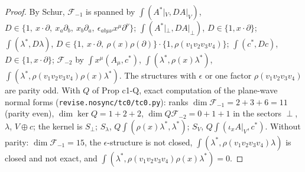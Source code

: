 \documentclass[11pt]{article}
\numberwithin{equation}{section}
\theoremstyle{plain}
\theoremstyle{definition}
\newcommand{\Ap}{A|_{\perp}}
\newcommand{\AV}{A|_V}
\begin{document}
\begin{proof}
By Schur, $\mathcal F_{-1}$ is spanned by $\int(A^*|_V,D\AV)$, $D\in\{1,\ x\cdot\partial,\ x_a\partial_b,\ x_b\partial_a,\ \epsilon_{ab\mu\nu}x^\mu\partial^\nu\}$; $\int(A^*|_\perp,D\Ap)$, $D\in\{1,x\cdot\partial\}$; $\int(\lambda^*,D\lambda)$, $D\in\{1,\ x\cdot\partial,\ \rho(x)\rho(\partial)\}\cdot\{1,\rho(v_1v_2v_3v_4)\}$; $\int(c^*,Dc)$, $D\in\{1,x\cdot\partial\}$; $\mathcal F_{-2}$ by $\int x^\mu(A_\mu,c^*)$, $\int(\lambda^*,\rho(x)\lambda^*)$, $\int(\lambda^*,\rho(v_1v_2v_3v_4)\rho(x)\lambda^*)$. The structures with $\epsilon$ or one factor $\rho(v_1v_2v_3v_4)$ are parity odd. With $Q$ of Prop c1-Q, exact computation of the plane-wave normal forms (\texttt{revise.nosync/tc0/tc0.py}): ranks $\dim\mathcal F_{-1}=2+3+6=11$ (parity even), $\dim\ker Q=1+2+2$, $\dim Q\mathcal F_{-2}=0+1+1$ in the sectors $\perp$, $\lambda$, $V\oplus c$; the kernel is $S_\perp$; $S_\lambda$, $Q\int(\rho(x)\lambda^*,\lambda^*)$; $S_V$, $Q\int(\iota_x\AV,c^*)$. Without parity: $\dim\mathcal F_{-1}=15$, the $\epsilon$-structure is not closed, $\int(\lambda^*,\rho(v_1v_2v_3v_4)\lambda)$ is closed and not exact, and $\int(\lambda^*,\rho(v_1v_2v_3v_4)\rho(x)\lambda^*)=0$.
\end{proof}
\end{document}
